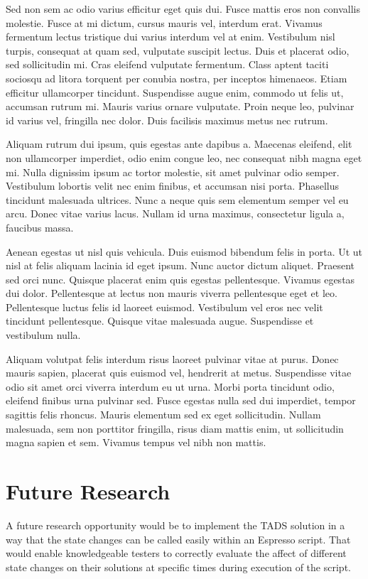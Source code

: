 Sed non sem ac odio varius efficitur eget quis dui. Fusce mattis eros non convallis molestie. Fusce at mi dictum, cursus mauris vel, interdum erat. Vivamus fermentum lectus tristique dui varius interdum vel at enim. Vestibulum nisl turpis, consequat at quam sed, vulputate suscipit lectus. Duis et placerat odio, sed sollicitudin mi. Cras eleifend vulputate fermentum. Class aptent taciti sociosqu ad litora torquent per conubia nostra, per inceptos himenaeos. Etiam efficitur ullamcorper tincidunt. Suspendisse augue enim, commodo ut felis ut, accumsan rutrum mi. Mauris varius ornare vulputate. Proin neque leo, pulvinar id varius vel, fringilla nec dolor. Duis facilisis maximus metus nec rutrum.

Aliquam rutrum dui ipsum, quis egestas ante dapibus a. Maecenas eleifend, elit non ullamcorper imperdiet, odio enim congue leo, nec consequat nibh magna eget mi. Nulla dignissim ipsum ac tortor molestie, sit amet pulvinar odio semper. Vestibulum lobortis velit nec enim finibus, et accumsan nisi porta. Phasellus tincidunt malesuada ultrices. Nunc a neque quis sem elementum semper vel eu arcu. Donec vitae varius lacus. Nullam id urna maximus, consectetur ligula a, faucibus massa.

Aenean egestas ut nisl quis vehicula. Duis euismod bibendum felis in porta. Ut ut nisl at felis aliquam lacinia id eget ipsum. Nunc auctor dictum aliquet. Praesent sed orci nunc. Quisque placerat enim quis egestas pellentesque. Vivamus egestas dui dolor. Pellentesque at lectus non mauris viverra pellentesque eget et leo. Pellentesque luctus felis id laoreet euismod. Vestibulum vel eros nec velit tincidunt pellentesque. Quisque vitae malesuada augue. Suspendisse et vestibulum nulla.

Aliquam volutpat felis interdum risus laoreet pulvinar vitae at purus. Donec mauris sapien, placerat quis euismod vel, hendrerit at metus. Suspendisse vitae odio sit amet orci viverra interdum eu ut urna. Morbi porta tincidunt odio, eleifend finibus urna pulvinar sed. Fusce egestas nulla sed dui imperdiet, tempor sagittis felis rhoncus. Mauris elementum sed ex eget sollicitudin. Nullam malesuada, sem non porttitor fringilla, risus diam mattis enim, ut sollicitudin magna sapien et sem. Vivamus tempus vel nibh non mattis.

\section{Future Research}
A future research opportunity would be to implement the TADS solution in a way that the state changes can be called easily within an Espresso script.  That would enable knowledgeable testers to correctly evaluate the affect of different state changes on their solutions at specific times during execution of the script.   

